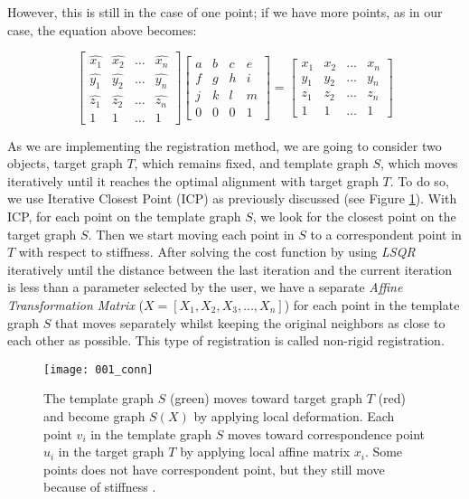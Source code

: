 \documentclass[../structure.tex]{subfiles}
\begin{document}
However,  this is still in the case of one point; if we have more points, as in our case, the equation above becomes:

\begin{equation*}
\begin{bmatrix}
\hat{x_{1}} & \hat{x_{2}} & \dots & \hat{x_{n}}\\
\hat{y_{1}} & \hat{y_{2}} & \dots & \hat{y_{n}}\\
\hat{z_{1}} & \hat{z_{2}} & \dots & \hat{z_{n}}\\
1 & 1 & \dots & 1
\end{bmatrix}
\begin{bmatrix}
a & b & c & e\\
f & g & h & i\\
j & k & l & m\\
0 & 0 & 0 & 1
\end{bmatrix}
=
\begin{bmatrix}
x_{1} & x_{2} & \dots & x_{n}\\
y_{1} & y_{2} & \dots & y_{n}\\
z_{1} & z_{2} & \dots & z_{n}\\
1 & 1 & \dots & 1
\end{bmatrix}
\end{equation*}

\pagebreak

\hspace{2em}As we are implementing the registration method, we are going to consider two objects, target graph $T$, which remains fixed, and template graph $S$, which moves iteratively until it reaches the optimal alignment with target graph $T$. To do so, we use Iterative Closest Point (ICP) as previously discussed (see Figure \ref{fig:icp}). With ICP, for each point on the template graph $S$, we look for the closest point on the target graph $S$. Then we start moving each point in $S$ to a correspondent point in $T$ with respect to stiffness. After solving the cost function by using \textit{LSQR} iteratively until the distance between the last iteration and the current iteration is less than a parameter selected by the user, we have a separate \textit{Affine Transformation Matrix} ($X = [X_{1}, X_{2}, X_{3}, ...,X_{n}]$) for each point in the template graph $S$ that moves separately whilst keeping the original neighbors as close to each other as possible. This type of registration is called non-rigid registration.

\begin{figure}[h!]
\centering
\texttt{[image: 001\_conn]}
\captionsetup{justification=centering}
\caption{The template graph $S$ (green) moves toward target graph $T$ (red) and become graph $S(X)$ by applying local deformation. Each point $v_{i}$ in the template graph $S$ moves toward correspondence point $u_{i}$ in the target graph $T$ by applying local affine matrix $x_{i}$. Some points does not have correspondent point, but they still move because of stiffness \cite{Amberg2007}.} 
\label{fig:icp}
\end{figure}
\end{document}
